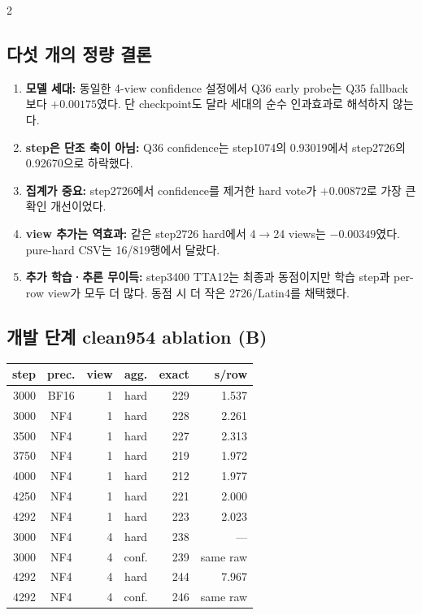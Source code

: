 \documentclass[9pt,a4paper]{extarticle}
\begin{document}
\vspace{2pt}
\begin{multicols}{2}
\subsection{다섯 개의 정량 결론}

\begin{enumerate}
\item \textbf{모델 세대:} 동일한 4-view confidence 설정에서 Q36 early probe는
Q35 fallback보다 $+0.00175$였다. 단 checkpoint도 달라 세대의 순수 인과효과로
해석하지 않는다.
\item \textbf{step은 단조 축이 아님:} Q36 confidence는 step1074의 0.93019에서
step2726의 0.92670으로 하락했다.
\item \textbf{집계가 중요:} step2726에서 confidence를 제거한 hard vote가
$+0.00872$로 가장 큰 확인 개선이었다.
\item \textbf{view 추가는 역효과:} 같은 step2726 hard에서 4$\rightarrow$24
views는 $-0.00349$였다. pure-hard CSV는 16/819행에서 달랐다.
\item \textbf{추가 학습·추론 무이득:} step3400 TTA12는 최종과 동점이지만
학습 step과 per-row view가 모두 더 많다. 동점 시 더 작은 2726/Latin4를 채택했다.
\end{enumerate}

\subsection{개발 단계 clean954 ablation (B)}

\scriptsize
\begin{tabularx}{\linewidth}{@{}r c r c r r@{}}
\toprule
step & prec. & view & agg. & exact & s/row\\
\midrule
3000 & BF16 & 1 & hard & 229 & 1.537\\
3000 & NF4 & 1 & hard & 228 & 2.261\\
3500 & NF4 & 1 & hard & 227 & 2.313\\
3750 & NF4 & 1 & hard & 219 & 1.972\\
4000 & NF4 & 1 & hard & 212 & 1.977\\
4250 & NF4 & 1 & hard & 221 & 2.000\\
4292 & NF4 & 1 & hard & 223 & 2.023\\
3000 & NF4 & 4 & hard & 238 & ---\\
3000 & NF4 & 4 & conf. & 239 & same raw\\
4292 & NF4 & 4 & hard & 244 & 7.967\\
4292 & NF4 & 4 & conf. & 246 & same raw\\
\bottomrule
\end{tabularx}
\normalsize


\end{multicols}
\end{document}
